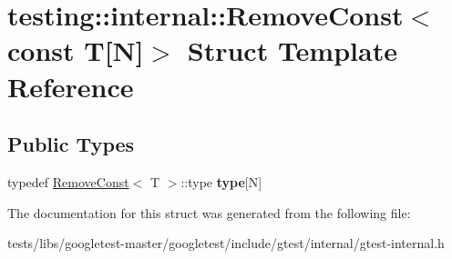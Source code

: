 \hypertarget{structtesting_1_1internal_1_1RemoveConst_3_01const_01T[N]_4}{}\section{testing\+:\+:internal\+:\+:Remove\+Const$<$ const T\mbox{[}N\mbox{]}$>$ Struct Template Reference}
\label{structtesting_1_1internal_1_1RemoveConst_3_01const_01T[N]_4}
\subsection*{Public Types}
\begin{DoxyCompactItemize}
\item 
\mbox{\label{structtesting_1_1internal_1_1RemoveConst_3_01const_01T[N]_4_ac976b53cb5d031a120fafbe790650068}} 
typedef \hyperlink{structtesting_1_1internal_1_1RemoveConst}{Remove\+Const}$<$ T $>$\+::type {\bfseries type}\mbox{[}N\mbox{]}
\end{DoxyCompactItemize}


The documentation for this struct was generated from the following file\+:\begin{DoxyCompactItemize}
\item 
tests/libs/googletest-\/master/googletest/include/gtest/internal/gtest-\/internal.\+h\end{DoxyCompactItemize}
